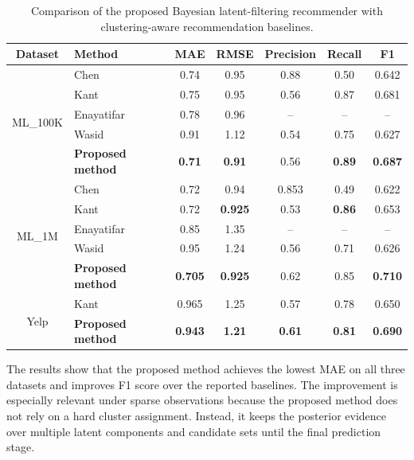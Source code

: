 \documentclass{article}
\theoremstyle{plain}
\theoremstyle{definition}
\theoremstyle{remark}
\begin{document}
\begin{table}[htbp]
	\centering
	\caption{Comparison of the proposed Bayesian latent-filtering recommender with clustering-aware recommendation baselines.}
	\label{tab:comparison_results}
	\renewcommand{\arraystretch}{1.3}
	\setlength{\tabcolsep}{3pt}
	\begin{tabular}{clccccc}
		\hline
		\textbf{Dataset} & \textbf{Method} & \textbf{MAE} & \textbf{RMSE} & \textbf{Precision} & \textbf{Recall} & \textbf{F1} \\
		\hline
		
		\multirow{5}{*}{ML\_100K}
		& Chen~\cite{liji2018improved} & 0.74 & 0.95 & 0.88 & 0.50 & 0.642 \\
		& Kant~\cite{kant2017leaderrank} & 0.75 & 0.95 & 0.56 & 0.87 & 0.681 \\
		& Enayatifar~\cite{mohammadpour2019efficient} & 0.78 & 0.96 & -- & -- & -- \\
		& Wasid~\cite{wasid2018clustering} & 0.91 & 1.12 & 0.54 & 0.75 & 0.627 \\
		& \textbf{Proposed method} & \textbf{0.71} & \textbf{0.91} & 0.56 & \textbf{0.89} & \textbf{0.687} \\
		\hline
		
		\multirow{5}{*}{ML\_1M}
		& Chen~\cite{liji2018improved} & 0.72 & 0.94 & 0.853 & 0.49 & 0.622 \\
		& Kant~\cite{kant2017leaderrank} & 0.72 & \textbf{0.925} & 0.53 & \textbf{0.86} & 0.653 \\
		& Enayatifar~\cite{mohammadpour2019efficient} & 0.85 & 1.35 & -- & -- & -- \\
		& Wasid~\cite{wasid2018clustering} & 0.95 & 1.24 & 0.56 & 0.71 & 0.626 \\
		& \textbf{Proposed method} & \textbf{0.705} & \textbf{0.925} & 0.62 & 0.85 & \textbf{0.710} \\
		\hline
		
		\multirow{2}{*}{Yelp}
		& Kant~\cite{kant2017leaderrank} & 0.965 & 1.25 & 0.57 & 0.78 & 0.650 \\
		& \textbf{Proposed method} & \textbf{0.943} & \textbf{1.21} & \textbf{0.61} & \textbf{0.81} & \textbf{0.690} \\
		\hline
	\end{tabular}
\end{table}

The results show that the proposed method achieves the lowest MAE on all three datasets and improves F1 score over the reported baselines. The improvement is especially relevant under sparse observations because the proposed method does not rely on a hard cluster assignment. Instead, it keeps the posterior evidence over multiple latent components and candidate sets until the final prediction stage.
\end{document}
